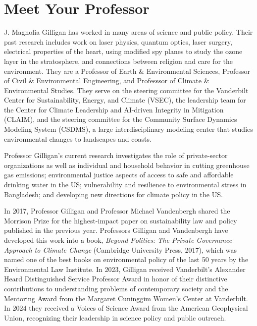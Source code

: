 \clearpage
\section{Meet Your Professor}
J. Magnolia Gilligan has worked in many areas of science and
public policy.
Their past research includes work on laser physics, quantum optics,
laser surgery, electrical properties of the heart, using modified spy
planes to study the ozone layer in the stratosphere, and connections
between religion and care for the environment.
They are a Professor of Earth \& Environmental Sciences,
Professor of Civil \& Environmental Engineering,
and Professsor of Climate \& Environmental Studies.
They serve on the steering committee for the Vanderbilt Center for
Sustainability, Energy, and Climate (VSEC),
the leadership team for the
Center for Climate Leadership and AI-driven Integrity in Mitigation
(CLAIM),
and the steering committee for the
Community Surface Dynamics Modeling System (CSDMS),
a large interdisciplinary modeling
center that studies environmental changes to landscapes and coasts.

Professor Gilligan's current research investigates the role of private-sector
organizations as well as individual and household behavior in cutting
greenhouse gas emissions;
environmental justice aspects of access to safe and affordable drinking
water in the US;
vulnerability and resilience to environmental stress in Bangladesh;
and developing new directions for climate policy in the US.

In 2017, Professor Gilligan and Professor Michael Vandenbergh shared
the Morrison Prize for the highest-impact paper on sustainability law and
policy published in the previous year. Professors Gilligan and Vandenbergh
have developed this work into a book,
\emph{Beyond Politics: The Private Governance Approach to Climate Change\/}
(Cambridge University Press, 2017), which was named one of the best
books on environmental policy of the last 50 years by the Environmental
Law Institute.
In 2023, Gilligan received Vanderbilt's Alexander Heard Distinguished
Service Professor Award in honor of their distinctive contributions to
understanding problems of contemporary society and the Mentoring
Award from the Margaret Cuninggim Women's Center at Vanderbilt.
In
2024 they received a Voices of Science Award from the American
Geophysical Union, recognizing their leadership in science policy and
public outreach.

